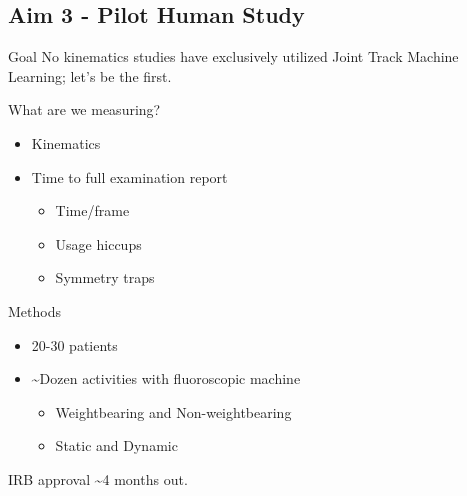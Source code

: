 \documentclass[presentation, aspectratio=1610]{beamer}
\begin{document}
\subsection{Aim 3 - Pilot Human Study}
\label{sec:org0bc8b47}
\begin{frame}[label={sec:org8dd53bd}]{Goal}
No kinematics studies have exclusively utilized Joint Track Machine Learning; let's be the first.

What are we measuring?
\begin{itemize}
\item Kinematics
\item Time to full examination report
\begin{itemize}
\item Time/frame
\item Usage hiccups
\item Symmetry traps
\end{itemize}
\end{itemize}
\end{frame}

\begin{frame}[label={sec:org00fcac6}]{Methods}
\begin{itemize}
\item 20-30 patients
\item \textasciitilde{}Dozen activities with fluoroscopic machine
\begin{itemize}
\item Weightbearing and Non-weightbearing
\item Static and Dynamic
\end{itemize}
\end{itemize}

IRB approval \textasciitilde{}4 months out.
\end{frame}
\end{document}

